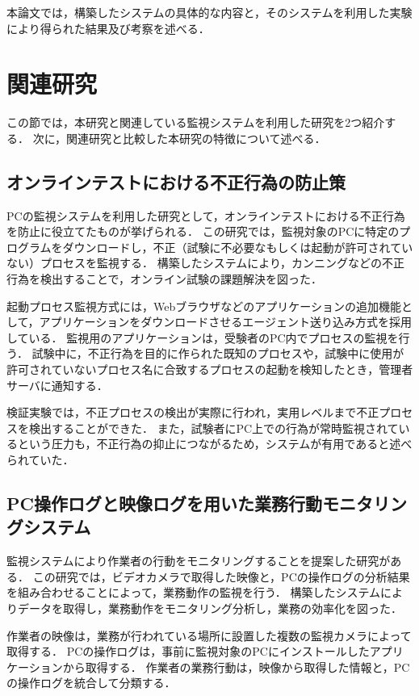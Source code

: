 本論文では，構築したシステムの具体的な内容と，そのシステムを利用した実験により得られた結果及び考察を述べる．

\section{関連研究}
この節では，本研究と関連している監視システムを利用した研究を2つ紹介する．
次に，関連研究と比較した本研究の特徴について述べる．

\subsection{オンラインテストにおける不正行為の防止策}
PCの監視システムを利用した研究として，オンラインテストにおける不正行為を防止に役立てたものが挙げられる\cite{Hari2006}．
この研究では，監視対象のPCに特定のプログラムをダウンロードし，不正（試験に不必要なもしくは起動が許可されていない）プロセスを監視する．
構築したシステムにより，カンニングなどの不正行為を検出することで，オンライン試験の課題解決を図った．

起動プロセス監視方式には，Webブラウザなどのアプリケーションの追加機能として，アプリケーションをダウンロードさせるエージェント送り込み方式を採用している．
監視用のアプリケーションは，受験者のPC内でプロセスの監視を行う．
試験中に，不正行為を目的に作られた既知のプロセスや，試験中に使用が許可されていないプロセス名に合致するプロセスの起動を検知したとき，管理者サーバに通知する．

検証実験では，不正プロセスの検出が実際に行われ，実用レベルまで不正プロセスを検出することができた．
また，試験者にPC上での行為が常時監視されているという圧力も，不正行為の抑止につながるため，システムが有用であると述べられていた．

\subsection{PC操作ログと映像ログを用いた業務行動モニタリングシステム}
監視システムにより作業者の行動をモニタリングすることを提案した研究がある\cite{Toba2010}．
この研究では，ビデオカメラで取得した映像と，PCの操作ログの分析結果を組み合わせることによって，業務動作の監視を行う．
構築したシステムによりデータを取得し，業務動作をモニタリング分析し，業務の効率化を図った．

作業者の映像は，業務が行われている場所に設置した複数の監視カメラによって取得する．
PCの操作ログは，事前に監視対象のPCにインストールしたアプリケーションから取得する．
作業者の業務行動は，映像から取得した情報と，PCの操作ログを統合して分類する．

